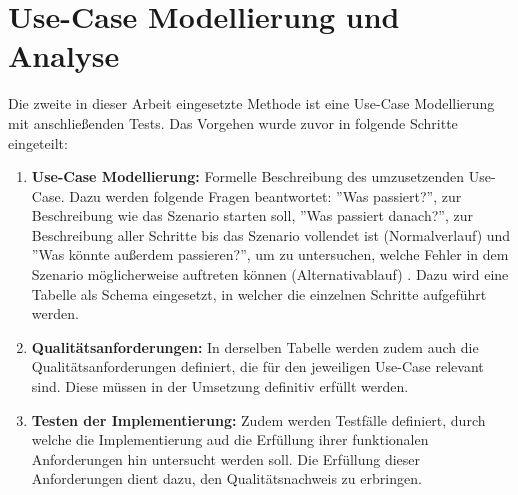 \section{Use-Case Modellierung und Analyse}

Die zweite in dieser Arbeit eingesetzte Methode ist eine Use-Case Modellierung mit anschließenden Tests. Das Vorgehen wurde zuvor in folgende Schritte eingeteilt:
\begin{enumerate}
    \item \textbf{Use-Case Modellierung:} Formelle Beschreibung des umzusetzenden Use-Case. Dazu werden folgende Fragen beantwortet: ''Was passiert?'', zur Beschreibung wie das Szenario starten soll, ''Was passiert danach?'', zur Beschreibung aller Schritte bis das Szenario vollendet ist (Normalverlauf) und ''Was könnte außerdem passieren?'', um zu untersuchen, welche Fehler in dem Szenario möglicherweise auftreten können (Alternativablauf) \cite[Vgl.][S. 52]{Rosenberg2007}. Dazu wird eine Tabelle als Schema eingesetzt, in welcher die einzelnen Schritte aufgeführt werden.
    \item \textbf{Qualitätsanforderungen:} In derselben Tabelle werden zudem auch die Qualitätsanforderungen definiert, die für den jeweiligen Use-Case relevant sind. Diese müssen in der Umsetzung definitiv erfüllt werden.
    \item \textbf{Testen der Implementierung:} Zudem werden Testfälle definiert, durch welche die Implementierung aud die Erfüllung ihrer funktionalen Anforderungen hin untersucht werden soll. Die Erfüllung dieser Anforderungen dient dazu, den Qualitätsnachweis zu erbringen.
\end{enumerate}